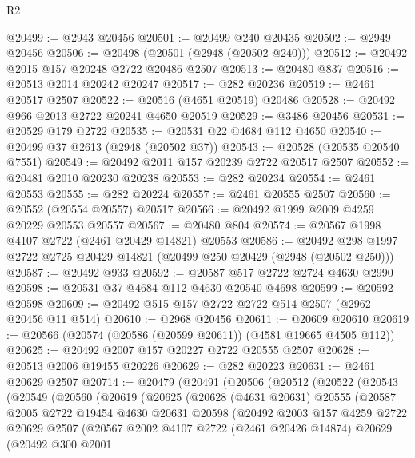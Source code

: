 \begin{lexlean}{R2}
\begin{coremodule}
@20499 := @2943 @20456
@20501 := @20499 @240 @20435
@20502 := @2949 @20456
@20506 := @20498 (@20501 (@2948 (@20502 @240)))
@20512 := @20492 @2015 @157 @20248 @2722 @20486 @2507
@20513 := @20480 @837
@20516 := @20513 @2014 @20242 @20247
@20517 := @282 @20236
@20519 := @2461 @20517 @2507
@20522 := @20516 (@4651 @20519) @20486
@20528 := @20492 @966 @2013 @2722 @20241 @4650 @20519
@20529 := @3486 @20456
@20531 := @20529 @179 @2722
@20535 := @20531 @22 @4684 @112 @4650
@20540 := @20499 @37 @2613 (@2948 (@20502 @37))
@20543 := @20528 (@20535 @20540 @7551)
@20549 := @20492 @2011 @157 @20239 @2722 @20517 @2507
@20552 := @20481 @2010 @20230 @20238
@20553 := @282 @20234
@20554 := @2461 @20553
@20555 := @282 @20224
@20557 := @2461 @20555 @2507
@20560 := @20552 (@20554 @20557) @20517
@20566 := @20492 @1999 @2009 @4259 @20229 @20553 @20557
@20567 := @20480 @804
@20574 := @20567 @1998 @4107 @2722 (@2461 @20429 @14821) @20553
@20586 := @20492 @298 @1997 @2722 @2725 @20429 @14821 (@20499 @250 @20429 (@2948 (@20502 @250)))
@20587 := @20492 @933
@20592 := @20587 @517 @2722 @2724 @4630 @2990
@20598 := @20531 @37 @4684 @112 @4630 @20540 @4698
@20599 := @20592 @20598
@20609 := @20492 @515 @157 @2722 @2722 @514 @2507 (@2962 @20456 @11 @514)
@20610 := @2968 @20456
@20611 := @20609 @20610
@20619 := @20566 (@20574 (@20586 (@20599 @20611)) (@4581 @19665 @4505 @112))
@20625 := @20492 @2007 @157 @20227 @2722 @20555 @2507
@20628 := @20513 @2006 @19455 @20226
@20629 := @282 @20223
@20631 := @2461 @20629 @2507
@20714 := @20479
    (@20491
      (@20506
        (@20512
          (@20522
            (@20543
              (@20549
                (@20560
                  (@20619
                    (@20625
                      (@20628
                        (@4631 @20631)
                        @20555
                        (@20587
                          @2005
                          @2722
                          @19454
                          @4630
                          @20631
                          @20598
                          (@20492
                            @2003
                            @157
                            @4259
                            @2722
                            @20629
                            @2507
                            (@20567
                              @2002
                              @4107
                              @2722
                              (@2461 @20426 @14874)
                              @20629
                              (@20492
                                @300
                                @2001

\end{coremodule}
\end{lexlean}
